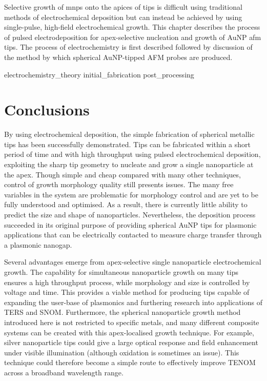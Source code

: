 \documentclass[12pt, a4paper, oneside]{book}
\begin{document}
Selective growth of \glspl{mnp} onto the apices of tips is difficult using traditional methods of electrochemical deposition but can instead be achieved by using single-pulse, high-field electrochemical growth. This chapter describes the process of pulsed electrodeposition for apex-selective nucleation and growth of AuNP \gls{afm} tips. The process of electrochemistry is first described followed by discussion of the method by which spherical AuNP-tipped AFM probes are produced.

{electrochemistry_theory}
{initial_fabrication}
{post_processing}

\section{Conclusions}

By using electrochemical deposition, the simple fabrication of spherical metallic tips has been successfully demonstrated. Tips can be fabricated within a short period of time and with high throughput using pulsed electrochemical deposition, exploiting the sharp tip geometry to nucleate and grow a single nanoparticle at the apex. Though simple and cheap compared with many other techniques, control of growth morphology quality still presents issues. The many free variables in the system are problematic for morphology control and are yet to be fully understood and optimised. As a result, there is currently little ability to predict the size and shape of nanoparticles. Nevertheless, the deposition process succeeded in its original purpose of providing spherical AuNP tips for plasmonic applications that can be electrically contacted to measure charge transfer through a plasmonic nanogap.

Several advantages emerge from apex-selective single nanoparticle electrochemical growth. The capability for simultaneous nanoparticle growth on many tips ensures a high throughput process, while morphology and size is controlled by voltage and time. This provides a viable method for producing tips capable of expanding the user-base of plasmonics and furthering research into applications of TERS and SNOM. Furthermore, the spherical nanoparticle growth method introduced here is not restricted to specific metals, and many different composite systems can be created with this apex-localised growth technique. For example, silver nanoparticle tips could give a large optical response and field enhancement under visible illumination (although oxidation is sometimes an issue). This technique could therefore become a simple route to effectively improve TENOM across a broadband wavelength range.

\ifstandalone
\begin{singlespace}
\fontsize{8pt}{1em}\selectfont
\printbibliography[notcategory=fullcited]
\end{singlespace}
\fi
\end{document}
